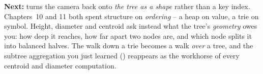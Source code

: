 \begin{lastword}
\medskip
\textbf{Next:}  turns the camera back onto \emph{the tree as a shape} rather than a key index.
Chapters~10 and 11 both spent structure on \emph{ordering} -- a heap on value, a trie on symbol. Height,
diameter and centroid ask instead what the tree's \emph{geometry} owes you: how deep it reaches, how far
apart two nodes are, and which node splits it into balanced halves. The walk down a trie becomes a walk
\emph{over} a tree, and the subtree aggregation you just learned () reappears as the
workhorse of every centroid and diameter computation.
\end{lastword}
